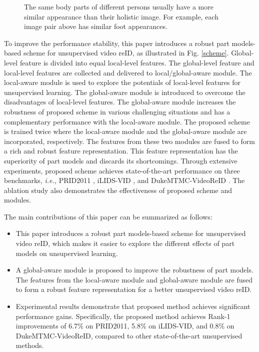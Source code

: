 \documentclass{cta-author}
\begin{document}
	\begin{figure}[!h]
		\caption{The same body parts of different persons usually have a more similar appearance than their holistic image. For example, each image pair above has similar foot appearances.} \label{motivation_contrastive}
	\end{figure}
	
	
	To improve the performance stability, this paper introduces a robust part models-based scheme for unsupervised video reID, as illustrated in Fig. \ref{scheme}. Global-level feature is divided into equal local-level features. The global-level feature and local-level features are collected and delivered to local/global-aware module. The local-aware module is used to explore the potentials of local-level features for unsupervised learning. The global-aware module is introduced to overcome the disadvantages of local-level features. The global-aware module increases the robustness of proposed scheme in various challenging situations and has a complementary performance with the local-aware module. The proposed scheme is trained twice where the local-aware module and the global-aware module are incorporated, respectively. The features from these two modules are fused to form a rich and robust feature representation. This feature representation has the superiority of part models and discards its shortcomings. Through extensive experiments, proposed scheme achieves state-of-the-art performance on three benchmarks, \textit{i.e.,} PRID2011 \cite{RN386}, iLIDS-VID \cite{RN385}, and DukeMTMC-VideoReID \cite{RN170} \cite{RN391}. The ablation study also demonstrates the effectiveness of proposed scheme and modules. 
	
	The main contributions of this paper can be summarized as follows:
	\begin{itemize}
		\item This paper introduces a robust part models-based scheme for unsupervised video reID, which makes it easier to explore the different effects of part models on unsupervised learning.
		\item A global-aware module is proposed to improve the robustness of part models. The features from the local-aware module and global-aware module are fused to form a robust feature representation for a better unsupervised video reID.
		\item Experimental results demonstrate that proposed method achieves significant performance gains. Specifically, the proposed method achieves Rank-1 improvements of 6.7\% on PRID2011, 5.8\% on iLIDS-VID, and 0.8\% on DukeMTMC-VideoReID, compared to other state-of-the-art unsupervised methods.
	\end{itemize}
	
\end{document}
